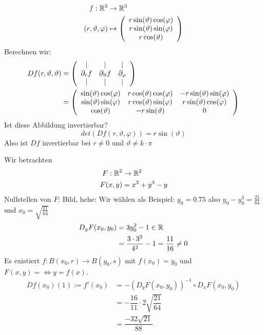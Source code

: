 \documentclass[main.tex]{subfiles}
\begin{document}
\begin{Beispiel}['Kugelkoordinaten']
  $$\begin{aligned}
    f: \mathbb{R}^3 & \to \mathbb{R}^3 \\
    (r,\vartheta, \varphi) & \mapsto \left(\begin{array}{c}
      r \sin(\vartheta) \cos(\varphi) \\
      r \sin(\vartheta) \sin(\varphi) \\
      r \cos(\vartheta)
    \end{array}\right)
  \end{aligned}$$
  Berechnen wir:
  $$\begin{aligned}
    Df(r, \vartheta, \vartheta) & =\left(\begin{array}{c c c}
      | & | & | \\
      \partial_r f & \partial_\vartheta f & \partial_\varphi \\
      | & | & |
    \end{array}\right)\\
    & = \left(\begin{array}{c c c}
      \sin(\vartheta) \cos(\varphi) & r \cos(\vartheta) \cos(\varphi) & -r \sin(\vartheta) \sin(\varphi)\\
      \sin(\vartheta) \sin(\varphi) & r \cos(\vartheta) \sin(\varphi) & r \sin(\vartheta)\cos(\varphi)\\
      \cos(\vartheta) & -r \sin(\vartheta) & 0
    \end{array}\right)
  \end{aligned}$$
  Ist diese Abbildung invertierbar?
  $$det(Df(r, \vartheta, \varphi)) = r \sin(\vartheta)$$
  Also ist $Df$ invertierbar bei $r \neq 0$ und $\vartheta \neq k \cdot \pi$
\end{Beispiel}

\begin{Beispiel}
  Wir betrachten
  $$\begin{aligned}
    F : \mathbb{R}^2 & \to \mathbb{R}^2 \\
    F(x,y) & = x^2 + y^3 - y
  \end{aligned}$$
  Nullstellen von $F$:
  Bild, hehe:
  Wir wählen als Beispiel: $y_0 = 0.75$ also $y_0 - y_0^3 = \frac{21}{64}$ und $x_0 = \sqrt{\frac{21}{64}}$
  $$\begin{aligned}
    D_y F(x_0,y_0) & = 3 y_0^2 - 1 \in \mathbb{R} \\
    & = \frac{3 \cdot 3^2}{4^2} - 1 = \dfrac{11}{16} \neq 0
  \end{aligned}$$
  Es existiert $f: B(x_0,r) \to B(y_0,s)$ mit $f(x_0) = y_0$ und $F(x,y) = \Leftrightarrow y = f(x)$.
  $$\begin{aligned}
    Df(x_0)(1) := f'(x_0) & = -(D_yF(x_0,y_0))^{-1} \circ D_x F(x_0,y_0) \\
    & = - \dfrac{16}{11} \cdot 2 \sqrt{\dfrac{21}{64}} \\
    & = \dfrac{-32 \sqrt{21}}{88}
  \end{aligned}$$
\end{Beispiel}
\end{document}
